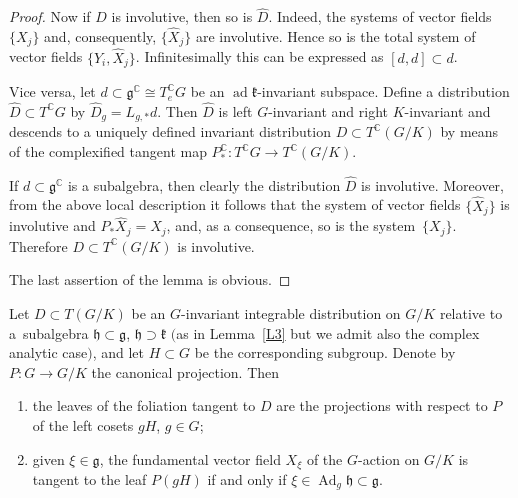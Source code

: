 \begin{proof}
Now if $D$ is involutive, then so is $\widehat D$. Indeed, the systems of vector fields $\{X_j\}$ and, consequently, $\big\{\widehat X_j\big\}$ are involutive. Hence so is the total system of vector fields $\big\{Y_i,\widehat X_j\big\}$. Infinitesimally this can be expressed as $[ d, d] \subset d$.

Vice versa, let $ d \subset\mathfrak{g}^\mathbb{C}\cong T^\mathbb{C}_eG$ be an $\operatorname{ad}\mathfrak{k}$-invariant subspace. Define a distribution $\widehat D \subset T^\mathbb{C} G$ by $\widehat D_g=L_{g,*} d$. Then $\widehat D$ is left $G$-invariant and right $K$-invariant and descends to a uniquely defined invariant distribution $D \subset T^\mathbb{C}(G/K)$ by means of the complexified tangent map $P_*^\mathbb{C}\colon \allowbreak T^\mathbb{C} G\to T^\mathbb{C}(G/K)$.

If $ d \subset \mathfrak{g}^\mathbb{C}$ is a subalgebra, then clearly the distribution $\widehat D$ is involutive. Moreover, from the above local description it follows that the system of vector fields $\big\{ \widehat X_j \big\} $ is involutive and $P_* \widehat X_j = X_j $, and, as a consequence, so is the system~$\{X_j\}$. Therefore $ D\subset T^\mathbb{C} (G/K)$ is involutive.

The last assertion of the lemma is obvious.
\end{proof}

\begin{Lemma}\label{L5}Let $D \subset T(G/K)$ be an $G$-invariant integrable distribution on $G/K$ relative to a~subalgebra $\mathfrak{h}\subset \mathfrak{g}$, $\mathfrak{h}\supset \mathfrak{k}$ $($as in Lemma~{\rm \ref{L3}} but we admit also the complex analytic case$)$, and let $H \subset G$ be the corresponding subgroup. Denote by $P\colon G\to G/K$ the canonical projection. Then
\begin{enumerate}\itemsep=0pt
\item[$1)$] the leaves of the foliation tangent to $D$ are the projections with respect to $P$ of the left cosets $gH$, $g\in G$;
\item[$2)$] given $\xi\in\mathfrak{g}$, the fundamental vector field $X_\xi$ of the $G$-action on $G/K$ is tangent to the leaf $P(gH)$ if and only if $\xi \in \operatorname{Ad}_g \mathfrak{h} \subset \mathfrak{g} $.
 \end{enumerate}
\end{Lemma}

